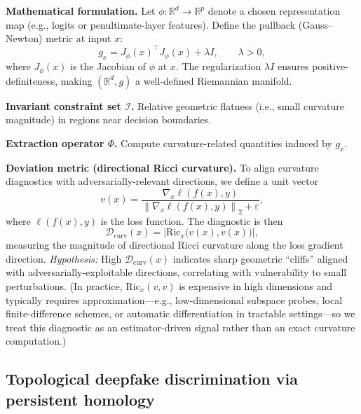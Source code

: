 \documentclass[11pt]{article}
\newcommand{\R}{\mathbb{R}}
\newcommand{\norm}[1]{\left\lVert #1 \right\rVert}
\newcommand{\abs}[1]{\left\lvert #1 \right\rvert}
\newcommand{\eps}{\varepsilon}
\begin{document}
\textbf{Mathematical formulation.}
Let $\phi:\R^{d}\to\R^{p}$ denote a chosen representation map (e.g., logits or penultimate-layer features). Define the pullback (Gauss--Newton) metric at input $x$:
\begin{equation}
g_x = J_\phi(x)^\top J_\phi(x) + \lambda I,
\qquad \lambda>0,
\end{equation}
where $J_\phi(x)$ is the Jacobian of $\phi$ at $x$. The regularization $\lambda I$ ensures positive-definiteness, making $(\R^{d},g)$ a well-defined Riemannian manifold.

\textbf{Invariant constraint set $\mathcal{I}$.}
Relative geometric flatness (i.e., small curvature magnitude) in regions near decision boundaries.

\textbf{Extraction operator $\Phi$.}
Compute curvature-related quantities induced by $g_x$.

\textbf{Deviation metric (directional Ricci curvature).}
To align curvature diagnostics with adversarially-relevant directions, we define a unit vector
\begin{equation}
v(x)=\frac{\nabla_x \ell(f(x),y)}{\norm{\nabla_x \ell(f(x),y)}_2+\eps},
\end{equation}
where $\ell(f(x),y)$ is the loss function. The diagnostic is then
\begin{equation}
\mathcal{D}_{\text{curv}}(x)=\abs{\mathrm{Ric}_x\!\big(v(x),v(x)\big)},
\end{equation}
measuring the magnitude of directional Ricci curvature along the loss gradient direction. \emph{Hypothesis:} High $\mathcal{D}_{\text{curv}}(x)$ indicates sharp geometric ``cliffs'' aligned with adversarially-exploitable directions, correlating with vulnerability to small perturbations. (In practice, $\mathrm{Ric}_x(v,v)$ is expensive in high dimensions and typically requires approximation---e.g., low-dimensional subspace probes, local finite-difference schemes, or automatic differentiation in tractable settings---so we treat this diagnostic as an estimator-driven signal rather than an exact curvature computation.)
\subsection{Topological deepfake discrimination via persistent homology}
\end{document}

